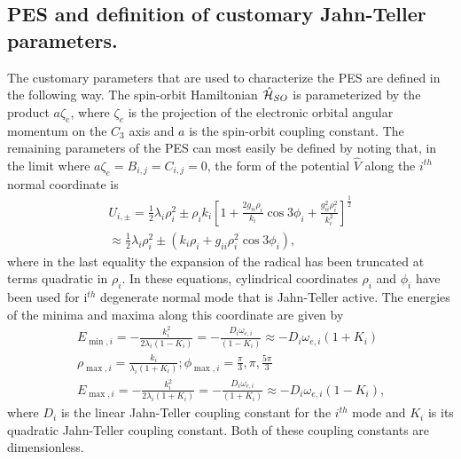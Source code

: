 \documentclass{article}
\begin{document}
\subsection{PES and definition of customary Jahn-Teller parameters.} 
The customary parameters that are used to characterize the 
PES are defined in the following way. The spin-orbit 
Hamiltonian $\hat{\cal H}_{SO}$ is parameterized by the product $a\zeta _e$,
where $\zeta _e$ is the projection of the electronic orbital angular
momentum on the $C_3$ axis and $a$ is the spin-orbit coupling constant.
The remaining parameters of the PES can most easily be defined by noting 
that, in the limit where $a\zeta _e = B_{i,j} = C_{i,j} = 0$, the form of the potential
$\hat{V}$ along the $i^{th}$ normal coordinate is
\begin{eqnarray}
  &U_{i,\pm }= \frac12 \lambda _i \rho _i^2 \pm \rho _i k_i
   \left[ 1 + \frac{2g_{ii}\rho _i}{k_i}\cos 3\phi _i + 
   \frac{g_{ii}^2\rho _i^2}{k_i^2} \right]^{\frac12} &\\
  &\approx \frac12 \lambda _i \rho _i^2 \pm \left( k_i \rho _i + 
  g_{ii}\rho _i^2 \cos 3\phi _i \right) ,& 
\label{U, no spin orbit}
\end{eqnarray}
where in the last equality the expansion of the radical has been
truncated at terms quadratic in $\rho _i$. In these equations, cylindrical 
coordinates $\rho _i$ and $\phi _i$ have been used for i$^{th}$ degenerate
normal mode that is Jahn-Teller active. 
The energies of the minima and maxima along this coordinate are given by
\begin{eqnarray}
&E_{\min ,i} =-\frac{k_{i}^{2}}{2\lambda _{i}(1-K_{i})}=-\frac{D_{i}\omega
_{e,i}}{(1-K_{i})}\approx -D_{i}\omega _{e,i}(1+K_{i})&
\label{E min, no spin orbit} \\
&\rho _{\max ,i} =\frac{k_{i}}{\lambda _{i}(1+K_{i})};
\phi _{\max ,i} = \frac{\pi }{3}, \pi , \frac{5\pi}{3}&
\label{rho max, no spin orbit} \\
&E_{\max ,i} =-\frac{k_{i}^{2}}{2\lambda _{i}(1+K_{i})}=-\frac{D_{i}\omega
_{e,i}}{(1+K_{i})}\approx -D_{i}\omega _{e,i}(1-K_{i})\text{,}&
\label{E max, no spin orbit}
\end{eqnarray}
where $D_{i}$ is the linear Jahn-Teller coupling constant for the $i^{th}$ 
mode and $K_{i}$ is its quadratic Jahn-Teller coupling constant. Both 
of these coupling constants are dimensionless.
\end{document}
